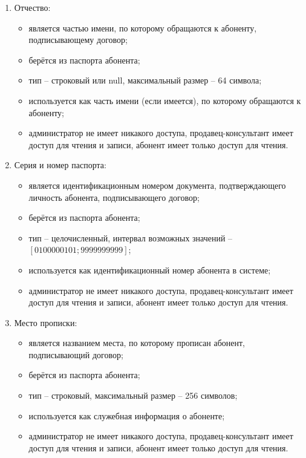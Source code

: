 \begin{enumerate}
\begin{enumerate}
        \item Отчество:
        \begin{itemize}
            \item является частью имени, по которому обращаются к абоненту, подписывающему договор;
            \item берётся из паспорта абонента;
            \item тип -- строковый или null, максимальный размер -- 64 символа;
            \item используется как часть имени (если имеется), по которому обращаются к абоненту;
            \item администратор не имеет никакого доступа, продавец-консультант имеет доступ для чтения и записи, абонент имеет только доступ для чтения.
        \end{itemize}

        \item Серия и номер паспорта:
        \begin{itemize}
            \item является идентификационным номером документа, подтверждающего личность абонента, подписывающего договор;
            \item берётся из паспорта абонента;
            \item тип -- целочисленный, интервал возможных значений -- $[0100000101; 9999999999]$;
            \item используется как идентификационный номер абонента в системе;
            \item администратор не имеет никакого доступа, продавец-консультант имеет доступ для чтения и записи, абонент имеет только доступ для чтения.
        \end{itemize}

        \item Место прописки:
        \begin{itemize}
            \item является названием места, по которому прописан абонент, подписывающий договор;
            \item берётся из паспорта абонента;
            \item тип -- строковый, максимальный размер -- 256 символов;
            \item используется как служебная информация о абоненте;
            \item администратор не имеет никакого доступа, продавец-консультант имеет доступ для чтения и записи, абонент имеет только доступ для чтения.
        \end{itemize}


\end{enumerate}
\end{enumerate}
